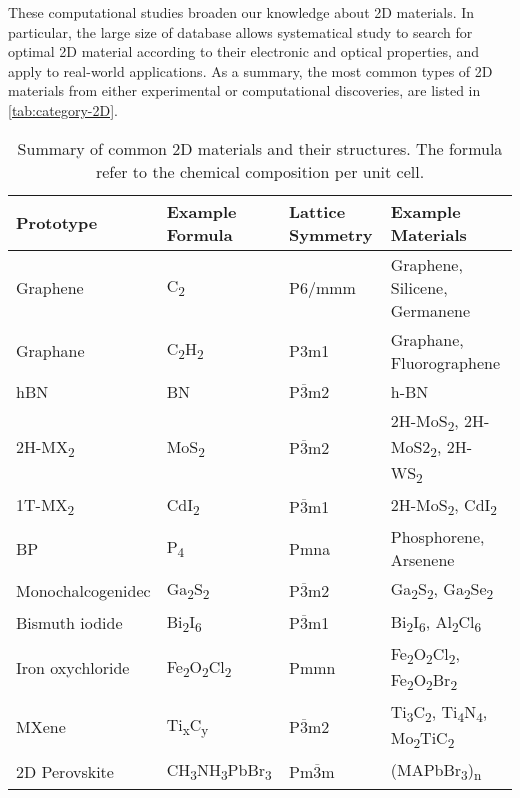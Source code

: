 These computational studies broaden our knowledge about 2D
materials. In particular, the large size of database allows
systematical study to search for optimal 2D material according to
their electronic and optical properties, and apply to real-world
applications. As a summary, the most common types of 2D materials from
either experimental or computational discoveries, are listed in
\autoref{tab:category-2D}.

\begin{table}
  \centering
  \caption{Summary of common 2D materials and their structures. The
    formula refer to the chemical composition per unit cell.}
  \label{tab:category-2D}
  \begin{tabularx}{1.00\textwidth}{XXXX}
    \hline
    Prototype  & Example Formula  & Lattice Symmetry & Example Materials \\
    \hline
    Graphene & C\textsubscript{2} &  P6/mmm & Graphene, Silicene, Germanene \\
    Graphane & C\textsubscript{2}H\textsubscript{2} &  P3m1 & Graphane, Fluorographene\\
    hBN      & BN                & P$\overline{3}$m2 & h-BN \\
    2H-MX\textsubscript{2} & MoS\textsubscript{2} & P$\overline{3}$m2 & 2H-MoS\textsubscript{2}, 2H-MoS2\textsubscript{2}, 2H-WS\textsubscript{2} \\
    1T-MX\textsubscript{2} & CdI\textsubscript{2} & P$\overline{3}$m1 & 2H-MoS\textsubscript{2}, CdI\textsubscript{2}\\
    BP & P\textsubscript{4} & Pmna & Phosphorene, Arsenene \\
    Monochalcogenidec & Ga\textsubscript{2}S\textsubscript{2} & P$\overline{3}$m2 & Ga\textsubscript{2}S\textsubscript{2}, Ga\textsubscript{2}Se\textsubscript{2} \\
    Bismuth iodide &  Bi\textsubscript{2}I\textsubscript{6} & P$\overline{3}$m1 & Bi\textsubscript{2}I\textsubscript{6}, Al\textsubscript{2}Cl\textsubscript{6} \\
    Iron oxychloride                &  Fe\textsubscript{2}O\textsubscript{2}Cl\textsubscript{2} & Pmmn & Fe\textsubscript{2}O\textsubscript{2}Cl\textsubscript{2}, Fe\textsubscript{2}O\textsubscript{2}Br\textsubscript{2}  \\
    MXene & Ti\textsubscript{x}C\textsubscript{y} & P$\overline{3}$m2 & Ti\textsubscript{3}C\textsubscript{2}, Ti\textsubscript{4}N\textsubscript{4}, Mo\textsubscript{2}TiC\textsubscript{2} \\
    2D Perovskite & CH\textsubscript{3}NH\textsubscript{3}PbBr\textsubscript{3} & Pm$\overline{3}$m & (MAPbBr\textsubscript{3})\textsubscript{n}\\
   \hline
\end{tabularx}
\end{table}

